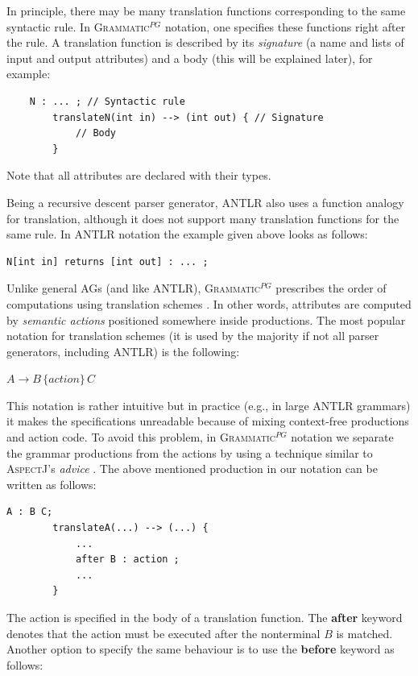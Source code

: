 \documentclass{informat} %
\newcommand{\tool}[1]{\textsc{#1}}
\newcommand{\ATF}{\textsc{Grammatic}$^{PG}$}
\begin{document}
In principle, there may be many translation functions corresponding to the same syntactic rule. In \ATF{} notation, one specifies these functions right after the rule. A translation function is described by its \emph{signature} (a name and lists of input and output attributes) and a body (this will be explained later), for example:
\begin{lstlisting}
	N : ... ; // Syntactic rule
		translateN(int in) --> (int out) { // Signature
			// Body
		}
\end{lstlisting}
Note that all attributes are declared with their types. 

Being a recursive descent parser generator, \tool{ANTLR} also uses a function analogy for translation, although it does not support many translation functions for the same rule. In \tool{ANTLR} notation the example given above looks as follows:
\begin{lstlisting}[language=ANTLR]
	N[int in] returns [int out] : ... ;
\end{lstlisting}

Unlike general AGs (and like \tool{ANTLR}), \ATF{} prescribes the order of computations using translation schemes \cite{DragonBook}. In other words, attributes are computed by \emph{semantic actions} positioned somewhere inside productions. The most popular notation for translation schemes (it is used by the majority if not all parser generators, including \tool{ANTLR}) is the following:

$A \rightarrow B \,\{action\} \,C$

This notation is rather intuitive but in practice (e.g., in large \tool{ANTLR} grammars) it makes the specifications unreadable because of mixing context-free productions and action code. To avoid this problem, in \ATF{} notation we separate the grammar productions from the actions by using a technique similar to \tool{AspectJ}'s \emph{advice} \cite{AspectJ}. The above mentioned production in our notation can be written as follows:

\begin{lstlisting}[emph={action},emphstyle={\it}]
	A : B C;
		translateA(...) --> (...) {
			...
			after B : action ;
			...
		}
\end{lstlisting}

The action is specified in the body of a translation function. The \textbf{after} keyword denotes that the action must be executed after the nonterminal $B$ is matched. Another option to specify the same behaviour is to use the \textbf{before} keyword as follows:
\end{document}
